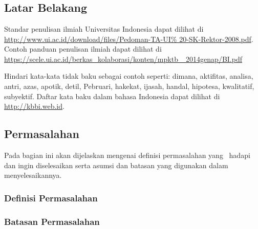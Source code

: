 \chapter{\babSatu}

\section{Latar Belakang}
Standar penulisan ilmiah Universitas Indonesia dapat dilihat di \url{http://www.ui.ac.id/download/files/Pedoman-TA-UI\% 20-SK-Rektor-2008.pdf}. Contoh panduan penulisan ilmiah dapat dilihat di \url{https://scele.ui.ac.id/berkas_kolaborasi/konten/mpktb_
2014genap/BI.pdf}


Hindari kata-kata tidak baku sebagai contoh seperti: dimana, aktifitas, analisa, antri, azas, apotik, detil, Pebruari, hakekat, ijasah, handal, hipotesa, kwalitatif, subyektif. Daftar kata baku dalam bahasa Indonesia dapat dilihat di \url{http://kbbi.web.id}.


\section{Permasalahan}
Pada bagian ini akan dijelaskan mengenai definisi permasalahan 
yang \saya~hadapi dan ingin diselesaikan serta asumsi dan batasan 
yang digunakan dalam menyelesaikannya.


\subsection{Definisi Permasalahan}


\subsection{Batasan Permasalahan}


